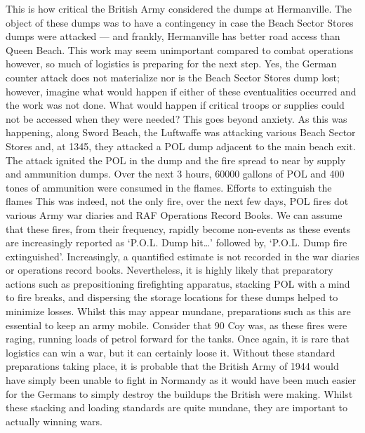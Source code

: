 \documentclass[noraggedright]{turabian-researchpaper}
\begin{document}
This is
how critical the British Army considered the dumps at Hermanville.  The 
object of these dumps was to have a contingency in case the Beach Sector 
Stores dumps were attacked --- and frankly, Hermanville has better road access
 than Queen Beach.  This work may seem unimportant compared to combat 
operations however, so much of logistics is preparing for the next step. 
Yes, the German counter attack does not materialize nor is the Beach Sector
Stores dump lost; however, imagine what would happen if either of these 
eventualities occurred and the work was not done.  What would happen if 
critical troops or supplies could not be accessed when they were needed?  
This goes beyond anxiety.  As this was happening, along Sword Beach, the 
Luftwaffe was attacking various Beach Sector Stores and, at 1345, they attacked
a POL dump adjacent to the main beach exit.  The attack ignited the POL in the
dump and the fire spread to near by supply and ammunition dumps.  Over the next 
3 hours, 60000 gallons of POL and 400 tones of ammunition were consumed in 
the flames.\autocite[8 June 1944]{1raf}  Efforts to extinguish the flames 
This was indeed, not the only fire, over the next few days, POL fires dot 
various Army war diaries and RAF Operations Record Books.  We can assume that
these fires, from their frequency, rapidly become non-events as these events
are increasingly reported as `P.O.L. Dump hit\ldots' followed by, `P.O.L. 
Dump fire extinguished'.\autocite[10 June 1944]{1raf}  Increasingly, a 
quantified estimate is not recorded in the war diaries or operations record
books.  Nevertheless, it is highly likely that preparatory actions such as
prepositioning firefighting apparatus, stacking POL with a mind to fire
breaks, and dispersing the storage locations for these dumps helped to minimize
losses.  Whilst this may appear mundane, preparations such as this are 
essential to keep an army mobile.  Consider that 90 Coy was, as these fires
were raging, running loads of petrol forward for the tanks.  Once again, it is
rare that logistics can win a war, but it can certainly loose it.  Without 
these standard preparations taking place, it is probable that the British 
Army of 1944 would have simply been unable to fight in Normandy as it would
have been much easier for the Germans to simply destroy the buildups the 
British were making.  Whilst these stacking and loading standards are quite 
mundane, they are important to actually winning wars.
\end{document}
